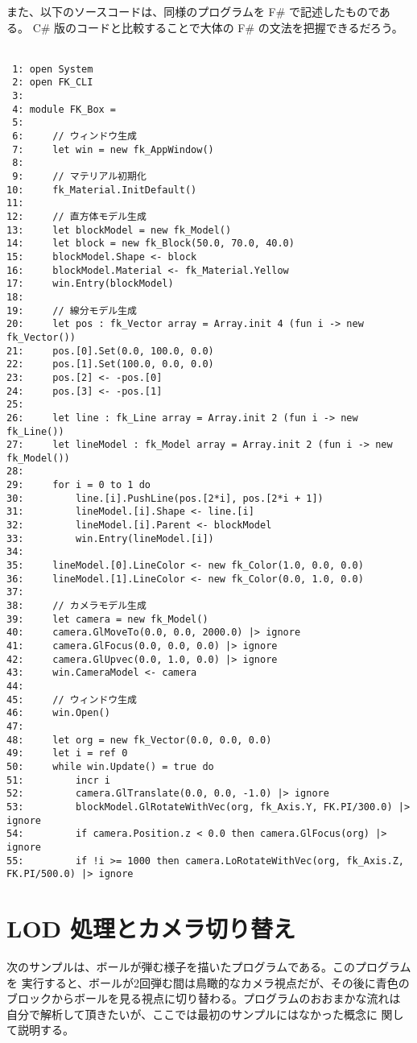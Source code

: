 また、以下のソースコードは、同様のプログラムを F\# で記述したものである。
C\# 版のコードと比較することで大体の F\# の文法を把握できるだろう。\\ ~

\begin{breakbox}
\begin{small}
\begin{verbatim}
 1: open System
 2: open FK_CLI
 3: 
 4: module FK_Box =
 5: 
 6:     // ウィンドウ生成
 7:     let win = new fk_AppWindow()
 8: 
 9:     // マテリアル初期化
10:     fk_Material.InitDefault()
11: 
12:     // 直方体モデル生成
13:     let blockModel = new fk_Model()
14:     let block = new fk_Block(50.0, 70.0, 40.0)
15:     blockModel.Shape <- block
16:     blockModel.Material <- fk_Material.Yellow
17:     win.Entry(blockModel)
18: 
19:     // 線分モデル生成
20:     let pos : fk_Vector array = Array.init 4 (fun i -> new fk_Vector())
21:     pos.[0].Set(0.0, 100.0, 0.0)
22:     pos.[1].Set(100.0, 0.0, 0.0)
23:     pos.[2] <- -pos.[0]
24:     pos.[3] <- -pos.[1]
25: 
26:     let line : fk_Line array = Array.init 2 (fun i -> new fk_Line())
27:     let lineModel : fk_Model array = Array.init 2 (fun i -> new fk_Model())
28: 
29:     for i = 0 to 1 do
30:         line.[i].PushLine(pos.[2*i], pos.[2*i + 1])
31:         lineModel.[i].Shape <- line.[i]
32:         lineModel.[i].Parent <- blockModel
33:         win.Entry(lineModel.[i])
34: 
35:     lineModel.[0].LineColor <- new fk_Color(1.0, 0.0, 0.0)
36:     lineModel.[1].LineColor <- new fk_Color(0.0, 1.0, 0.0)
37: 
38:     // カメラモデル生成
39:     let camera = new fk_Model()
40:     camera.GlMoveTo(0.0, 0.0, 2000.0) |> ignore
41:     camera.GlFocus(0.0, 0.0, 0.0) |> ignore
42:     camera.GlUpvec(0.0, 1.0, 0.0) |> ignore
43:     win.CameraModel <- camera
44: 
45:     // ウィンドウ生成
46:     win.Open()
47: 
48:     let org = new fk_Vector(0.0, 0.0, 0.0)
49:     let i = ref 0
50:     while win.Update() = true do
51:         incr i
52:         camera.GlTranslate(0.0, 0.0, -1.0) |> ignore
53:         blockModel.GlRotateWithVec(org, fk_Axis.Y, FK.PI/300.0) |> ignore
54:         if camera.Position.z < 0.0 then camera.GlFocus(org) |> ignore
55:         if !i >= 1000 then camera.LoRotateWithVec(org, fk_Axis.Z, FK.PI/500.0) |> ignore
\end{verbatim}
\end{small}
\end{breakbox}

\section{LOD 処理とカメラ切り替え}
次のサンプルは、ボールが弾む様子を描いたプログラムである。このプログラムを
実行すると、ボールが2回弾む間は鳥瞰的なカメラ視点だが、その後に青色の
ブロックからボールを見る視点に切り替わる。プログラムのおおまかな流れは
自分で解析して頂きたいが、ここでは最初のサンプルにはなかった概念に
関して説明する。

